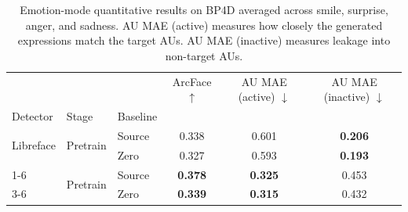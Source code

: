 \begin{table}[htb]
\caption{Emotion-mode quantitative results on BP4D averaged across smile, surprise, anger, and sadness. AU MAE (active) measures how closely the generated expressions match the target \acp{AU}. AU MAE (inactive) measures leakage into non-target \acp{AU}.}
\label{tab:results-emotion-bp4d}
\begin{tabular}{lllccc}
\toprule
 &  &  & ArcFace $\uparrow$ & AU MAE (active) $\downarrow$ & AU MAE (inactive) $\downarrow$ \\
Detector & Stage & Baseline &  &  &  \\
\midrule
\multirow[t]{2}{*}{Libreface} & \multirow[t]{2}{*}{Pretrain} & Source & 0.338 & 0.601 & \textbf{0.206} \\
\cmidrule{3-6}
 &  & Zero & 0.327 & 0.593 & \textbf{0.193} \\
\cmidrule{1-6}
\multirow[t]{2}{*}{Pyfeat} & \multirow[t]{2}{*}{Pretrain} & Source & \textbf{0.378} & \textbf{0.325} & 0.453 \\
\cmidrule{3-6}
 &  & Zero & \textbf{0.339} & \textbf{0.315} & 0.432 \\
\bottomrule
\end{tabular}
\end{table}
